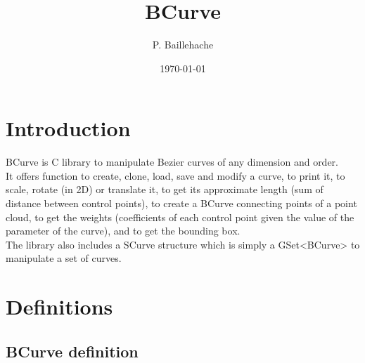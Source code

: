 \documentclass[12pt, a4paper]{article}
\begin{document}
\title{BCurve}
\author{P. Baillehache}
\date{\today}
\maketitle

\tableofcontents

\section*{Introduction}

BCurve is C library to manipulate Bezier curves of any dimension and order.\\ 

It offers function to create, clone, load, save and modify a curve, to print it, to scale, rotate (in 2D) or translate it, to get its approximate length (sum of distance between control points), to create a BCurve connecting points of a point cloud, to get the weights (coefficients of each control point given the value of the parameter of the curve), and to get the bounding box.\\ 

The library also includes a SCurve structure which is simply a GSet<BCurve> to manipulate a set of curves.\\

\section{Definitions}

\subsection{BCurve definition}
\end{document}
